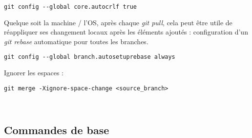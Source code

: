 \documentclass[11pt,twoside,a4paper]{article}
\begin{document}
\begin{landscape}
\begin{multicols}{2}
	\begin{verbatim}
git config --global core.autocrlf true
	\end{verbatim}

Quelque soit la machine / l'OS, après chaque \emph{git pull}, cela peut être utile de réappliquer ses changement locaux après les éléments ajoutés : configuration d'un \emph{git rebase} automatique pour toutes les branches. 

	\begin{verbatim}
git config --global branch.autosetuprebase always
	\end{verbatim}
 
Ignorer les espaces :
	\begin{verbatim}
git merge -Xignore-space-change <source_branch>
	\end{verbatim}

	\vfill~\\
	\columnbreak
	
	\subsection*{Commandes de base}
	

\end{multicols}
\end{landscape}
\end{document}
